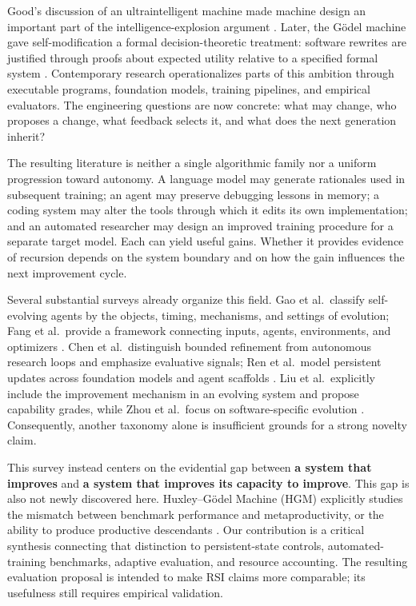 \documentclass[11pt,american,]{article}
\begin{document}
Good's discussion of an ultraintelligent machine made machine design an
important part of the intelligence-explosion argument \citep{good1965}.
Later, the Gödel machine gave self-modification a formal
decision-theoretic treatment: software rewrites are justified through
proofs about expected utility relative to a specified formal system
\citep{goedel2003}. Contemporary research operationalizes parts of this
ambition through executable programs, foundation models, training
pipelines, and empirical evaluators. The engineering questions are now
concrete: what may change, who proposes a change, what feedback selects
it, and what does the next generation inherit?

The resulting literature is neither a single algorithmic family nor a
uniform progression toward autonomy. A language model may generate
rationales used in subsequent training; an agent may preserve debugging
lessons in memory; a coding system may alter the tools through which it
edits its own implementation; and an automated researcher may design an
improved training procedure for a separate target model. Each can yield
useful gains. Whether it provides evidence of recursion depends on the
system boundary and on how the gain influences the next improvement
cycle.

Several substantial surveys already organize this field. Gao et
al.~classify self-evolving agents by the objects, timing, mechanisms,
and settings of evolution; Fang et al.~provide a framework connecting
inputs, agents, environments, and optimizers
\citep{surveygao2025, surveyfang2025}. Chen et al.~distinguish bounded
refinement from autonomous research loops and emphasize evaluative
signals; Ren et al.~model persistent updates across foundation models
and agent scaffolds \citep{surveychen2026, surveyren2026}. Liu et
al.~explicitly include the improvement mechanism in an evolving system
and propose capability grades, while Zhou et al.~focus on
software-specific evolution \citep{surveyliu2026, surveycoding2026}.
Consequently, another taxonomy alone is insufficient grounds for a
strong novelty claim.

This survey instead centers on the evidential gap between \textbf{a
system that improves} and \textbf{a system that improves its capacity to
improve}. This gap is also not newly discovered here. Huxley--Gödel
Machine (HGM) explicitly studies the mismatch between benchmark
performance and metaproductivity, or the ability to produce productive
descendants \citep{hgm2025}. Our contribution is a critical synthesis
connecting that distinction to persistent-state controls,
automated-training benchmarks, adaptive evaluation, and resource
accounting. The resulting evaluation proposal is intended to make RSI
claims more comparable; its usefulness still requires empirical
validation.
\end{document}
